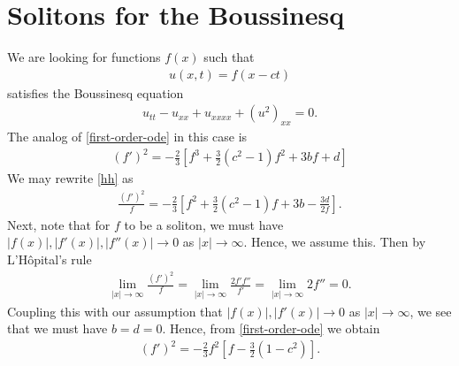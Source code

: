 \documentclass[12pt,reqno]{amsart}
\numberwithin{equation}{section}  %
\begin{document}
\section{Solitons for the Boussinesq} 
\label{sec:soliton}
We are looking for functions $f(x)$ such that
%
%
\begin{equation}
  \label{ansatz-bous}
\begin{split}
u(x,t) = f(x-ct)
\end{split}
\end{equation}
%
%
satisfies the Boussinesq equation
%
%
\begin{equation}
  \label{bous-eqn*}
\begin{split}
  u_{tt} -u_{xx} + u_{xxxx} + (u^{2})_{xx} = 0.
\end{split}
\end{equation}
%
%
The analog of \eqref{first-order-ode} in this case is
%
%
\begin{equation}
  \label{hh}
\begin{split}
  (f')^{2} = -\frac{2}{3} \left [ f^{3} + \frac{3}{2}(c^{2}-1)f^{2} + 3bf +d \right ]
\end{split}
\end{equation}
%
We may rewrite \eqref{hh} as
%
%
\begin{equation}
  \label{first-order-rewritten}
\begin{split}
  \frac{(f')^{2}}{f} = -\frac{2}{3}\left[ f^{2} + \frac{3}{2}(c^{2}-1)f+ 3b -
  \frac{3d}{2f}\right].
\end{split}
\end{equation}
%
%
Next, note that for $f$ to be a soliton, we must have $|f(x)|, |f'(x)|,
|f''(x)| \to 0$ as $|x| \to \infty$. Hence, we assume this. 
Then by L'H\^opital's rule
%
%
\begin{equation*}
\begin{split}
  \lim_{|x| \to \infty} \frac{(f')^{2}}{f} = \lim_{|x| \to \infty} \frac{2f'
  f''}{f'} = \lim_{|x| \to \infty} 2f'' = 0.
\end{split}
\end{equation*}
%
%
Coupling this with our assumption that $| f(x) |, | f'(x) | \to 0$ as $|x| \to
\infty$, we see that we must have $b =d=0$. Hence, from 
\eqref{first-order-ode} we obtain 
%
%
\begin{equation}
  \label{bous-ode-simp}
\begin{split}
  (f')^{2} = -\frac{2}{3} f^{2} \left[ f - \frac{3}{2}(1-c^{2})  \right].
\end{split}
\end{equation}
\end{document}
